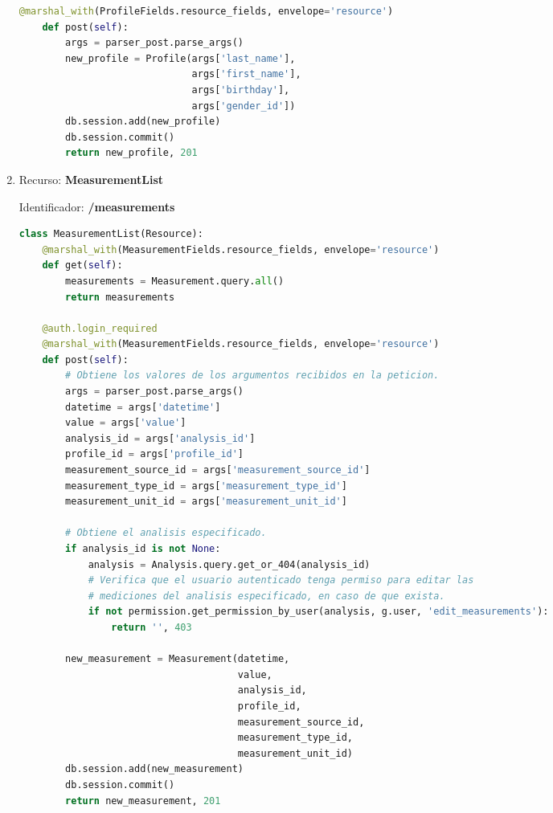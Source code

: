 \documentclass[a4paper,12pt]{article}
\begin{document}
\begin{enumerate}
\begin{lstlisting}[language=Python]
    @marshal_with(ProfileFields.resource_fields, envelope='resource')
    def post(self):
        args = parser_post.parse_args()
        new_profile = Profile(args['last_name'],
                              args['first_name'],
                              args['birthday'],
                              args['gender_id'])
        db.session.add(new_profile)
        db.session.commit()
        return new_profile, 201
\end{lstlisting}

\item Recurso: \textbf{MeasurementList}

Identificador: \textbf{/measurements}

\begin{lstlisting}[language=Python]
class MeasurementList(Resource):
    @marshal_with(MeasurementFields.resource_fields, envelope='resource')
    def get(self):
        measurements = Measurement.query.all()
        return measurements

    @auth.login_required
    @marshal_with(MeasurementFields.resource_fields, envelope='resource')
    def post(self):
        # Obtiene los valores de los argumentos recibidos en la peticion.
        args = parser_post.parse_args()
        datetime = args['datetime']
        value = args['value']
        analysis_id = args['analysis_id']
        profile_id = args['profile_id']
        measurement_source_id = args['measurement_source_id']
        measurement_type_id = args['measurement_type_id']
        measurement_unit_id = args['measurement_unit_id']

        # Obtiene el analisis especificado.
        if analysis_id is not None:
            analysis = Analysis.query.get_or_404(analysis_id)
            # Verifica que el usuario autenticado tenga permiso para editar las
            # mediciones del analisis especificado, en caso de que exista.
            if not permission.get_permission_by_user(analysis, g.user, 'edit_measurements'):
                return '', 403

        new_measurement = Measurement(datetime,
                                      value,
                                      analysis_id,
                                      profile_id,
                                      measurement_source_id,
                                      measurement_type_id,
                                      measurement_unit_id)
        db.session.add(new_measurement)
        db.session.commit()
        return new_measurement, 201
\end{lstlisting}


\end{enumerate}
\end{document}
